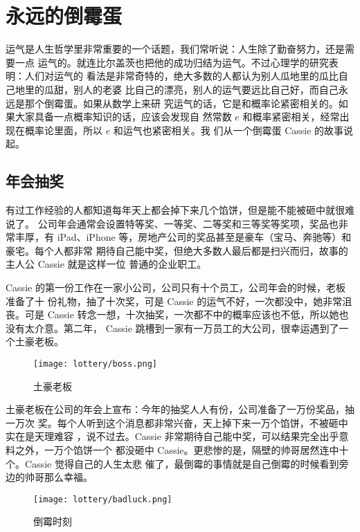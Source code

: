 %

\chapter{永远的倒霉蛋}

运气是人生哲学里非常重要的一个话题，我们常听说：人生除了勤奋努力，还是需要一点
运气的。就连比尔盖茨也把他的成功归结为运气。不过心理学的研究表明：人们对运气的
看法是非常奇特的，绝大多数的人都认为别人瓜地里的瓜比自己地里的瓜甜，别人的老婆
比自己的漂亮，别人的运气要远比自己好，而自己永远是那个倒霉蛋。如果从数学上来研
究运气的话，它是和概率论紧密相关的。如果大家具备一点概率知识的话，应该会发现自
然常数 $e$ 和概率紧密相关，经常出现在概率论里面，所以 $e$ 和运气也紧密相关。我
们从一个倒霉蛋 Cassie 的故事说起。

\section{年会抽奖}

有过工作经验的人都知道每年天上都会掉下来几个馅饼，但是能不能被砸中就很难说了。
公司年会通常会设置特等奖、一等奖、二等奖和三等奖等奖项，奖品也非常丰厚，有 
iPad、iPhone 等，房地产公司的奖品甚至是豪车（宝马、奔驰等）和豪宅。每个人都非常
期待自己能中奖，但绝大多数人最后都是扫兴而归，故事的主人公 Cassie 就是这样一位
普通的企业职工。

Cassie 的第一份工作在一家小公司，公司只有十个员工，公司年会的时候，老板准备了十
份礼物，抽了十次奖，可是 Cassie 的运气不好，一次都没中，她非常沮丧。可是 Cassie
转念一想，十次抽奖，一次都不中的概率应该也不低，所以她也没有太介意。第二年，
Cassie 跳槽到一家有一万员工的大公司，很幸运遇到了一个土豪老板。
\begin{figure}[H]
\centering
\texttt{[image: lottery/boss.png]}
\caption{土豪老板}
\centering
\end{figure}

土豪老板在公司的年会上宣布：今年的抽奖人人有份，公司准备了一万份奖品，抽一万次
奖。每个人听到这个消息都非常兴奋，天上掉下来一万个馅饼，不被砸中实在是天理难容
，说不过去。Cassie 非常期待自己能中奖，可以结果完全出乎意料之外，一万个馅饼一个
都没砸中 Cassie。更悲惨的是，隔壁的帅哥居然连中十个。Cassie 觉得自己的人生太悲
催了，最倒霉的事情就是自己倒霉的时候看到旁边的帅哥那么幸福。
\begin{figure}[H]
\centering
\texttt{[image: lottery/badluck.png]}
\caption{倒霉时刻}
\centering
\end{figure}

